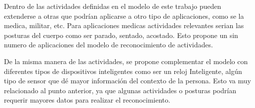 Dentro de las actividades definidas en el modelo de este trabajo pueden extenderse a otras que podrían aplicarse a otro tipo de aplicaciones, como se la medica, militar, etc. Para aplicaciones medicas actividades relevantes serian las posturas del cuerpo como ser parado, sentado, acostado. Esto propone un sin numero de aplicaciones del modelo de reconocimiento de actividades. 

De la misma manera de las actividades, se propone complementar el modelo con diferentes tipos de dispositivos inteligentes como ser un reloj Inteligente, algún tipo de sensor que dé mayor información del contexto de la persona. Esto va muy relacionado al punto anterior, ya que algunas actividades o posturas podrían requerir mayores datos para realizar el reconocimiento.


